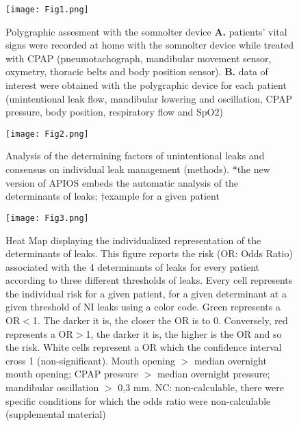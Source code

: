 \begin{figure}[htbp!]
\centering
\texttt{[image: Fig1.png]}
\caption{Polygraphic assesment with the somnolter device
\textbf{A.} patients’ vital signs were recorded at home with the somnolter device while treated with CPAP (pneumotachograph, mandibular movement sensor, oxymetry, thoracic belts and body position sensor). \textbf{B.} data of interest were obtained with the polygraphic device for each patient (unintentional leak flow, mandibular lowering and oscillation, CPAP pressure, body position, respiratory flow and SpO2)}%
\label{fig:fig1}
\end{figure}

\begin{figure}[htbp!]
\centering
\texttt{[image: Fig2.png]}
\caption{Analysis of the determining factors of unintentional leaks and consensus on individual leak management (methods).
*the new version of APIOS embeds the automatic analysis of the determinants of leaks; †example for a given patient
}%
\label{fig:fig2}
\end{figure}

\begin{figure}[H]%
\centering
\texttt{[image: Fig3.png]}
\caption{Heat Map displaying the individualized representation of the determinants of leaks. This figure reports the risk (OR: Odds Ratio) associated with the 4 determinants of leaks for every patient according to three different thresholds of leaks. Every cell represents the individual risk for a given patient, for a given determinant at a given threshold of NI leaks using a color code.
Green represents a OR$<$1. The darker it is, the closer the OR is to 0. Conversely, red represents a OR$>$1, the darker it is, the higher is the OR and so the risk. White cells represent a OR which the confidence interval cross 1 (non-significant).
Mouth opening $>$ median overnight mouth opening; CPAP pressure $>$ median overnight pressure; mandibular oscillation $>$ 0,3 mm. NC: non-calculable, there were specific conditions for which the odds ratio were non-calculable (supplemental material)}%
\label{fig:fig3}
\end{figure}





